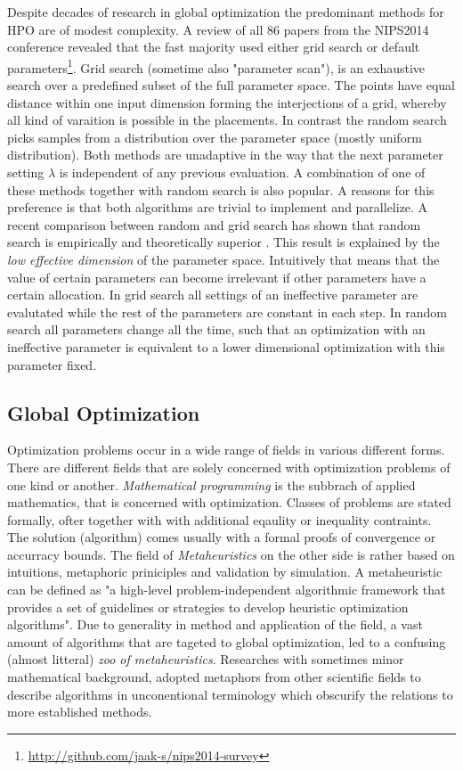 \documentclass[english]{article}
\begin{document}
Despite decades of research in global optimization the predominant methods for HPO are of modest complexity. A review of all 86 papers from the NIPS2014 conference revealed that the fast majority used either grid search or default parameters\footnote{\url{http://github.com/jaak-s/nips2014-survey}}. Grid search (sometime also "parameter scan"), is an exhaustive search over a predefined subset of the full parameter space. The points have equal distance within one input dimension forming the interjections of a grid, whereby all kind of varaition is possible in the placements. In contrast the random search picks samples from a distribution over the parameter space (mostly uniform distribution). Both methods are unadaptive in the way that the next parameter setting $\lambda$ is independent of any previous evaluation. A combination of one of these methods together with random search is also popular. A reasons for this preference is that both algorithms are trivial to implement and parallelize. A recent comparison between random and grid search has shown that random search is empirically and theoretically superior \cite{bergstra_random_2012}. This result is explained by the  \textit{low effective dimension} of the parameter space. Intuitively that means that the value of certain parameters can become irrelevant if other parameters have a certain allocation. In grid search all settings of an ineffective parameter are evalutated while the rest of the parameters are constant in each step. In random search all parameters change all the time, such that an optimization with an ineffective parameter is equivalent to a lower dimensional optimization with this parameter fixed.

\subsection{Global Optimization}
Optimization problems occur in a wide range of fields in various different forms. There are different fields that are solely concerned with optimization problems of one kind or another. \textit{Mathematical programming} is the subbrach of applied mathematics, that is concerned with optimization. Classes of problems are stated formally, ofter together with with additional eqaulity or inequality contraints. The solution (algorithm) comes usually with a formal proofs of convergence or accurracy bounds. The field of \textit{Metaheuristics}
on the other side is rather based on intuitions, metaphoric priniciples and validation by simulation. A metaheuristic can be defined as "a high-level problem-independent algorithmic framework that provides a set of guidelines or strategies to develop heuristic optimization algorithms". \cite{sorensen_history_2014} Due to generality in method and application of the field, a vast amount of algorithms that are tageted to global optimization, led to a confusing (almost litteral) \textit{zoo of metaheuristics}. Researches with sometimes minor mathematical background, adopted metaphors from other scientific fields to describe algorithms in unconentional terminology which obscurify the relations to more established methods. \cite{sorensen_metaheuristics-metaphor_2015}
\end{document}
